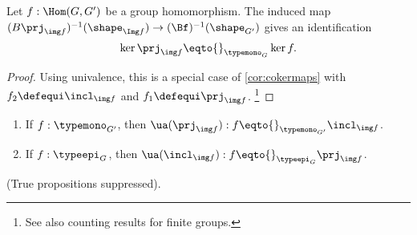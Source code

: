 \begin{lemma}
  \label{lem:kerandcoker}
  Let $f:\Hom(G,G')$ be a group homomorphism.
  The induced map $(B\prj_{\img f})^{-1}(\shape_{\Img f})\to (\Bf)^{-1}(\shape_{G'})$ gives an identification
  \[
    \ker\prj_{\img f}\eqto{}_{\typemono_G} \ker f.
  \]
\end{lemma}
\begin{proof}
  Using univalence, this is a special case of \cref{cor:cokermaps} with $f_2\defequi\incl_{\img f}$ and $f_1\defequi\prj_{\img f}$.
  \footnote{%
    See also counting results for finite groups.
  }
\end{proof}
\begin{xca}
  \begin{enumerate}
  \item If $f:\typemono_{G'}$, then $\ua(\prj_{\img f}):f\eqto{}_{\typemono_{G'}}\incl_{\img f}$.
  \item If $f:\typeepi_G$, then $\ua(\incl_{\img f}):f\eqto{}_{\typeepi_{G}}\prj_{\img f}$.
  \end{enumerate}
(True propositions suppressed).
\end{xca}




